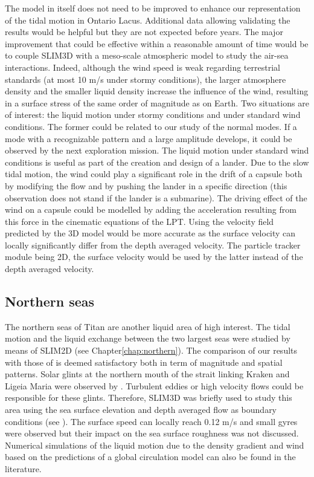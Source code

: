 The model in itself does not need to be improved to enhance our representation of the tidal motion in Ontario Lacus. Additional data allowing validating the results would be helpful but they are not expected before years. The major improvement that could be effective within a reasonable amount of time would be to couple SLIM3D with a meso-scale atmospheric model to study the air-sea interactions. Indeed, although the wind speed is weak regarding terrestrial standards (at most 10 m/s under stormy conditions), the larger atmosphere density and the smaller liquid density increase the influence of the wind, resulting in a surface stress of the same order of magnitude as on Earth. Two situations are of interest: the liquid motion under stormy conditions and under standard wind conditions. The former could be related to our study of the normal modes. If a mode with a recognizable pattern and a large amplitude develops, it could be observed by the next exploration mission. The liquid motion under standard wind conditions is useful as part of the creation and design of a lander. Due to the slow tidal motion, the wind could play a significant role in the drift of a capsule both by modifying the flow and by pushing the lander in a specific direction (this observation does not stand if the lander is a submarine). The driving effect of the wind on a capsule could be modelled by adding the acceleration resulting from this force in the cinematic equations of the LPT. Using the velocity field predicted by the 3D model would be more accurate as the surface velocity can locally significantly differ from the depth averaged velocity. The particle tracker module being 2D, the surface velocity would be used by the latter instead of the depth averaged velocity.



\subsection*{Northern seas}
The northern seas of Titan are another liquid area of high interest. The tidal motion and the liquid exchange between the two largest seas were studied by means of SLIM2D (see Chapter\ref{chap:northern}). The comparison of our results with those of \cite{tokano2014numerical} is deemed satisfactory both in term of magnitude and spatial patterns. Solar glints at the northern mouth of the strait linking Kraken and Ligeia Maria were observed by \cite{sotin2012observations}. Turbulent eddies or high velocity flows could be responsible for these glints. Therefore, SLIM3D was briefly used to study this area using the sea surface elevation and depth averaged flow as boundary conditions (see \cite{vincent2017study}). The surface speed can locally reach 0.12 m/s and small gyres were observed but their impact on the sea surface roughness was not discussed. Numerical simulations of the liquid motion due to the density gradient \citep{tokano2015sun} and wind \citep{tokano2015wind} based on the predictions of a global circulation model can also be found in the literature.

